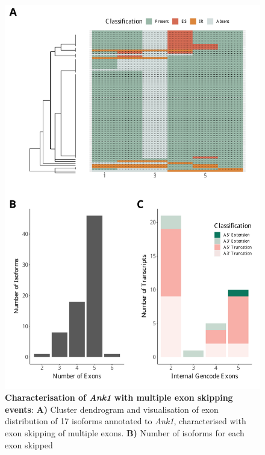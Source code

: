 \begin{figure}[htp]
	\begin{center}
		\includegraphics[page=6,trim={1cm 1cm 0 2cm},scale = 0.55]{Figures/TargetGenes.pdf}
	\end{center}
	\captionsetup{width=0.95\textwidth}
	\caption[Characterisation of \textit{Ank1} with multiple exon skipping events]%
	{\textbf{Characterisation of \textit{Ank1} with multiple exon skipping events}: \textbf{A)} Cluster dendrogram and visualisation of exon distribution of 17 isoforms annotated to \textit{Ank1}, characterised with exon skipping of multiple exons. \textbf{B)} Number of isoforms for each exon skipped}   
	\label{fig:Ank1}
\end{figure}

\newpage
